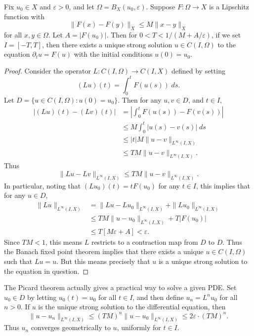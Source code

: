 \begin{theorem}[Picard]
    Fix $u_0 \in X$ and $\varepsilon > 0$, and let $\Omega = B_X(u_0,\varepsilon)$. Suppose $F: \Omega \to X$ is a Lipschitz function with
    \[ \| F(x) - F(y) \|_X \leq M \| x - y \|_X \]
    for all $x,y \in \Omega$. Let $A = |F(u_0)|$. Then for $0 < T < 1/(M + A/\varepsilon)$, if we set $I = [-T,T]$, then there exists a unique strong solution $u \in C(I,\Omega)$ to the equation $\partial_t u = F(u)$ with the initial conditions $u(0) = u_0$.
\end{theorem}
\begin{proof}
    Consider the operator $L: C(I,\Omega) \to C(I,X)$ defined by setting
    \[ (Lu)(t) = \int_0^t F(u(s))\; ds. \]
    Let $D = \{ u \in C(I,\Omega) : u(0) = u_0 \}$. Then for any $u,v \in D$, and $t \in I$,
    \begin{align*}
        |(Lu)(t) - (Lv)(t)| &= \left| \int_0^t F(u(s)) - F(v(s)) \right|\\
        &\leq M \int_0^t |u(s) - v(s)|\; ds\\
        &\leq |t| M \| u - v \|_{L^\infty(I,X)}\\
        &\leq T M \| u - v \|_{L^\infty(I,X)}.
    \end{align*}
    Thus
    \[ \| Lu - Lv \|_{L^\infty(I,X)} \leq TM \| u - v \|_{L^\infty(I,X)}. \]
    In particular, noting that $(Lu_0)(t) = t F(u_0)$ for any $t \in I$, this implies that for any $u \in D$,
    \begin{align*}
        \| Lu \|_{L^\infty(I,X)} &= \| Lu - Lu_0 \|_{L^\infty(I,X)} + \| Lu_0 \|_{L^\infty(I,X)}\\
        &\leq TM \| u - u_0 \|_{L^\infty(I,X)} + T |F(u_0)|\\
        &\leq T[M \varepsilon + A] < \varepsilon.
    \end{align*}
    Since $TM < 1$, this means $L$ restricts to a contraction map from $D$ to $D$. Thus the Banach fixed point theorem implies that there exists a unique $u \in C(I,\Omega)$ such that $Lu = u$. But this means precisely that $u$ is a unique strong solution to the equation in question.
\end{proof}

\begin{remark}
    The Picard theorem actually gives a practical way to solve a given PDE. Set $u_0 \in D$ by letting $u_0(t) = u_0$ for all $t \in I$, and then define $u_n = L^n u_0$ for all $n > 0$. If $u$ is the unique strong solution to the differential equation, then
    \[ \| u - u_n \|_{L^\infty(I,X)} \leq (TM)^n \| u - u_0 \|_{L^\infty(I,X)} \leq 2 \varepsilon \cdot (TM)^n. \]
    Thus $u_n$ converges geometrically to $u$, uniformly for $t \in I$.
\end{remark}

